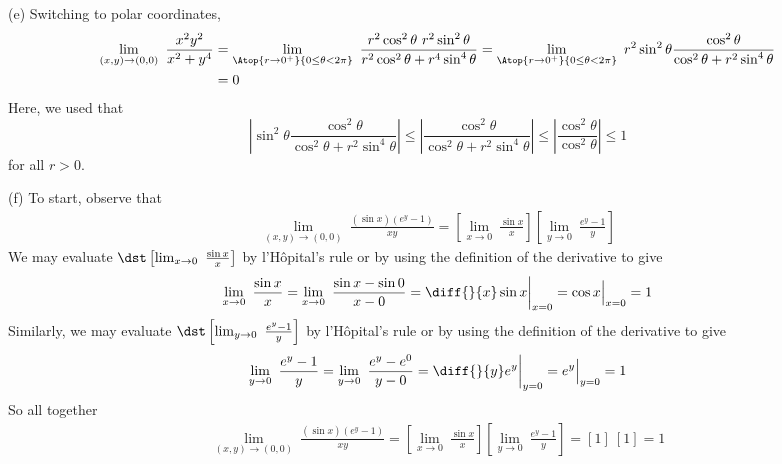 \begin{solution}
(e) Switching to polar coordinates,
\begin{align*}
    \lim_{(x,y)\rightarrow(0,0)}\ \frac{x^2y^2}{x^2+y^4}
    &=\lim_{\Atop{r\rightarrow0^+}{0\le\theta<2\pi}}\ 
                                \frac{r^2\cos^2\theta\ r^2\sin^2\theta}
                                      {r^2\cos^2\theta+r^4\sin^4\theta}
   =\lim_{\Atop{r\rightarrow0^+}{0\le\theta<2\pi}}\ r^2\sin^2\theta
                  \frac{\cos^2\theta}{\cos^2\theta+r^2\sin^4\theta} \\
   &=  0
\end{align*} 
Here, we used that 
\begin{equation*}
\left|\sin^2\theta\frac{\cos^2\theta} {\cos^2\theta+r^2\sin^4\theta}\right|
\le \left|\frac{\cos^2\theta} {\cos^2\theta+r^2\sin^4\theta}\right|
\le \left|\frac{\cos^2\theta} {\cos^2\theta}\right|\le 1
\end{equation*} 
for all $r>0$.

(f) To start, observe that
\begin{align*}
\lim_{(x,y)\rightarrow (0,0)}\ 
                  \frac{(\sin x)\left(e^y-1\right)}{xy}
          =\left[\lim_{x\rightarrow 0}\ 
                  \frac{\sin x}{x}\right]
            \left[\lim_{y\rightarrow 0}\ 
                  \frac{e^y-1}{y}\right]
\end{align*}
We may evaluate  $\dst\left[\lim_{x\rightarrow 0}\ 
                  \frac{\sin x}{x}\right]$
by l'H\^opital's rule or by using the definition of the derivative to give
\begin{equation*}
\lim_{x\rightarrow 0}\ \frac{\sin x}{x}
=\lim_{x\rightarrow 0}\ \frac{\sin x-\sin 0}{x-0}
=\diff{}{x}\sin x\bigg|_{x=0}
=\cos x\Big|_{x=0}=1
\end{equation*}
Similarly, we may evaluate  $\dst\left[\lim_{y\rightarrow 0}\ 
                  \frac{e^y-1}{y}\right]$
by l'H\^opital's rule or by using the definition of the derivative to give
\begin{equation*}
\lim_{y\rightarrow 0}\ \frac{e^y-1}{y}
=\lim_{y\rightarrow 0}\ \frac{e^y-e^0}{y-0}
=\diff{}{y}e^y\bigg|_{y=0}
=e^y\Big|_{y=0}=1
\end{equation*}
So all together
\begin{align*}
\lim_{(x,y)\rightarrow (0,0)}\ 
                  \frac{(\sin x)\left(e^y-1\right)}{xy}
          =\left[\lim_{x\rightarrow 0}\ 
                  \frac{\sin x}{x}\right]
            \left[\lim_{y\rightarrow 0}\ 
                  \frac{e^y-1}{y}\right]
          =[1]\ [1]=1
\end{align*}
\end{solution}

